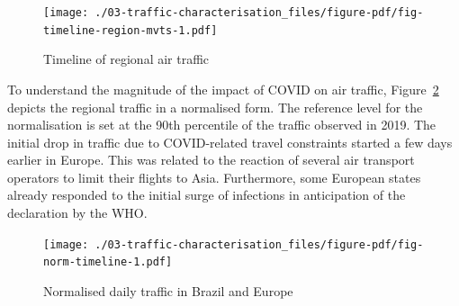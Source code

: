\documentclass[
  a4paper,
  DIV=11,
  numbers=noendperiod]{scrreprt}
\begin{document}
\begin{figure}[h]

{\centering \texttt{[image: ./03-traffic-characterisation\_files/figure-pdf/fig-timeline-region-mvts-1.pdf]}

}

\caption{\label{fig-timeline-region-mvts}Timeline of regional air
traffic}

\end{figure}

To understand the magnitude of the impact of COVID on air traffic,
Figure~\ref{fig-norm-timeline} depicts the regional traffic in a
normalised form. The reference level for the normalisation is set at the
90th percentile of the traffic observed in 2019. The initial drop in
traffic due to COVID-related travel constraints started a few days
earlier in Europe. This was related to the reaction of several air
transport operators to limit their flights to Asia. Furthermore, some
European states already responded to the initial surge of infections in
anticipation of the declaration by the WHO.

\begin{figure}[h]

{\centering \texttt{[image: ./03-traffic-characterisation\_files/figure-pdf/fig-norm-timeline-1.pdf]}

}

\caption{\label{fig-norm-timeline}Normalised daily traffic in Brazil and
Europe}

\end{figure}
\end{document}
